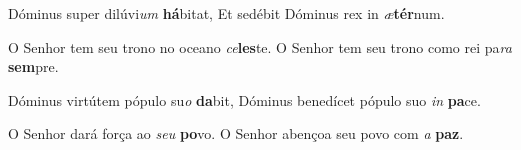 \begin{greenumerate}
  \switchcolumn*


  \item Dóminus super dilúvi\textit{um} \textbf{há}bitat,  {\GreStar} Et sedébit Dóminus rex in \textit{æ}\textbf{tér}num. 

  \switchcolumn%

  \item O Senhor tem seu trono no oceano \textit{ce}\textbf{les}te.  {\GreStar} O Senhor tem seu trono como rei pa\textit{ra} \textbf{sem}pre. 

  \switchcolumn*


  \item Dóminus virtútem pópulo su\textit{o} \textbf{da}bit,  {\GreStar} Dóminus benedícet pópulo suo \textit{in} \textbf{pa}ce. 

  \switchcolumn%

  \item O Senhor dará força ao \textit{seu} \textbf{po}vo.  {\GreStar} O Senhor abençoa seu povo com \textit{a} \textbf{paz}. 
\end{greenumerate}